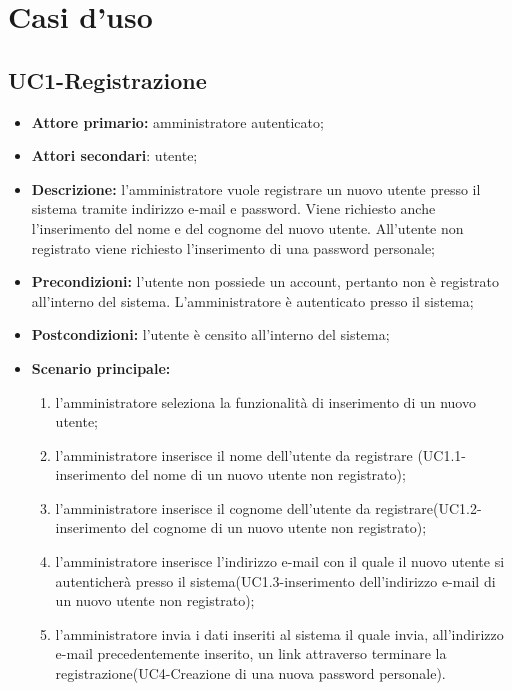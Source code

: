 \section{Casi d'uso}

\subsection{UC1-Registrazione}
\begin{itemize}
	\item \textbf{Attore primario:} amministratore autenticato;

	\item \textbf{Attori secondari}: utente;

	\item \textbf{Descrizione:} l'amministratore vuole registrare un nuovo utente presso il sistema tramite indirizzo e-mail e password. Viene richiesto anche l'inserimento del nome e del cognome del nuovo utente. All'utente non registrato viene richiesto l'inserimento di una password personale;

	\item \textbf{Precondizioni:} l'utente non possiede un account, pertanto non è registrato all'interno del sistema. L'amministratore è autenticato presso il sistema;
 
	\item \textbf{Postcondizioni:} l'utente è censito all'interno del sistema;

	\item \textbf{Scenario principale:}
	\begin{enumerate}
   		 \item l'amministratore seleziona la funzionalità di inserimento di un nuovo utente;
    	 \item l'amministratore inserisce il nome dell'utente da registrare (UC1.1-inserimento del nome di un nuovo utente non registrato); 
    	 \item l'amministratore inserisce il cognome dell'utente da registrare(UC1.2-inserimento del cognome di un nuovo utente non registrato); 
   	 	 \item l'amministratore inserisce l'indirizzo e-mail con il quale il nuovo utente si autenticherà presso il sistema(UC1.3-inserimento dell'indirizzo e-mail di un nuovo utente non registrato);
    	 \item l'amministratore invia i dati inseriti al sistema il quale invia, all'indirizzo e-mail precedentemente inserito, un link attraverso terminare la registrazione(UC4-Creazione di una nuova password personale).
	\end{enumerate}
\end{itemize}

